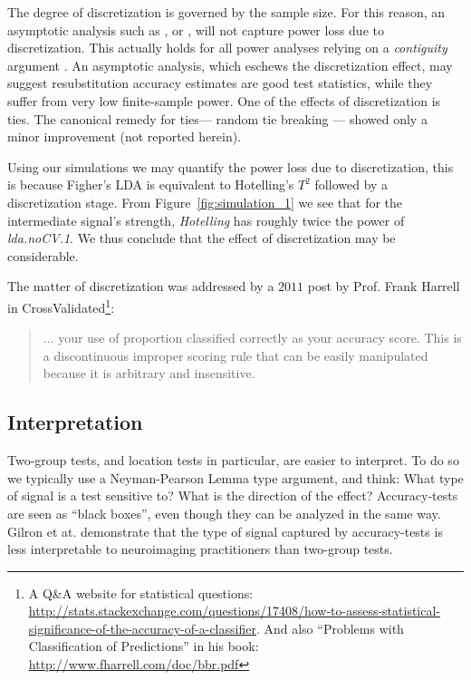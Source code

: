 \documentclass[]{bio}
\begin{document}
The degree of discretization is governed by the sample size. 
For this reason, an asymptotic analysis such as \cite{ramdas_classification_2016}, or \cite{golland_permutation_2005}, will not capture power loss due to discretization. This actually holds for all power analyses relying on a \emph{contiguity} argument \cite[Ch.6]{vaart_asymptotic_1998}.
An asymptotic analysis, which eschews the discretization effect,  may suggest resubstitution accuracy estimates are good test statistics, while they suffer from very low finite-sample power. 
One of the effects of discretization is ties. 
The canonical remedy for ties--- random tie breaking --- showed only a minor improvement (not reported herein).

Using our simulations we may quantify the power loss due to discretization, this is because Figher's LDA is equivalent to Hotelling's $T^2$ followed by a discretization stage. 
From Figure~\ref{fig:simulation_1} we see that for the intermediate signal's strength, \emph{Hotelling} has roughly twice the power of \emph{lda.noCV.1}.
We thus conclude that the effect of discretization may be considerable. 


The matter of discretization was addressed by a $2011$ post by Prof. Frank Harrell in \textsf{CrossValidated\footnote{A Q\&A website for statistical questions: \url{http://stats.stackexchange.com/questions/17408/how-to-assess-statistical-significance-of-the-accuracy-of-a-classifier}. And also ``Problems with Classification of Predictions'' in his book: \url{http://www.fharrell.com/doc/bbr.pdf}}}:
\begin{quote}
	... your use of proportion classified correctly as your accuracy score. This is a discontinuous improper scoring rule that can be easily manipulated because it is arbitrary and insensitive.
\end{quote}





\subsection{Interpretation}
Two-group tests, and location tests in particular, are easier to interpret. 
To do so we typically use a Neyman-Pearson Lemma type argument, and think:
What type of signal is a test sensitive to?
What is the direction of the effect? 
Accuracy-tests are seen as ``black boxes'', even though they can be analyzed in the same way. 
Gilron et at.\cite{gilron2017s} demonstrate that the type of signal captured by accuracy-tests is less interpretable to neuroimaging practitioners than two-group tests. 
\end{document}
